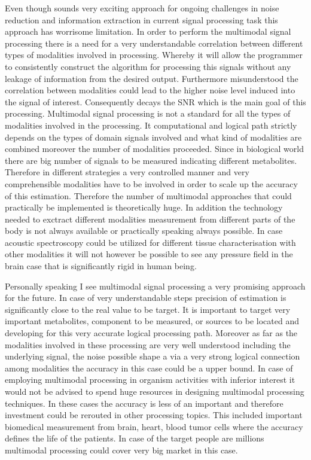 \documentclass[a4paper]{article}
\begin{document}
Even though sounds very exciting approach for ongoing challenges in noise reduction and information extraction in current signal processing task this approach has worrisome limitation. In order to perform the multimodal signal processing there is a need for a very understandable correlation between different types of modalities involved in processing. Whereby it will allow the programmer to consistently construct the algorithm for processing this signals without any leakage of information from the desired output. Furthermore misunderstood the correlation between modalities could lead to the higher noise level induced into the signal of interest. Consequently decays the SNR which is the main goal of this processing. Multimodal signal processing is not a standard for all the types of modalities involved in the processing. It computational and logical path strictly depends on the types of domain signals involved and what kind of modalities are combined moreover the number of modalities proceeded. Since in biological world there are big number of signals to be measured indicating different metabolites. Therefore in different strategies a very controlled manner and very comprehensible modalities have to be involved in order to scale up the accuracy of this estimation. Therefore the number of multimodal approaches that could practically be implemented is theoretically huge. In addition the technology needed to exctract different modalities measurement from different parts of the body is not always available or practically speaking always possible. In case acoustic spectroscopy could be utilized for different tissue characterisation with other modalities it will not however be possible to see any pressure field in the brain case that is significantly rigid in human being.  

Personally speaking I see multimodal signal processing a very promising approach for the future. In case of very understandable steps precision of estimation is significantly close to the real value to be target. It is important to target very important metabolites, component to be measured, or sources to be located and developing for this very accurate logical processing path. Moreover as far as the modalities involved in these processing are very well understood including the underlying signal, the noise possible shape a via a very strong logical connection among modalities the accuracy in this case could be a upper bound. In case of employing multimodal processing in organism activities with inferior interest it would not be advised to spend huge resources in designing multimodal processing techniques. In these cases the accuracy is less of an important and therefore investment could be rerouted in other processing topics. This included important biomedical measurement from brain, heart, blood tumor cells where the accuracy defines the life of the patients. In case of the target people are millions multimodal processing could cover very big market in this case.  
\end{document}

